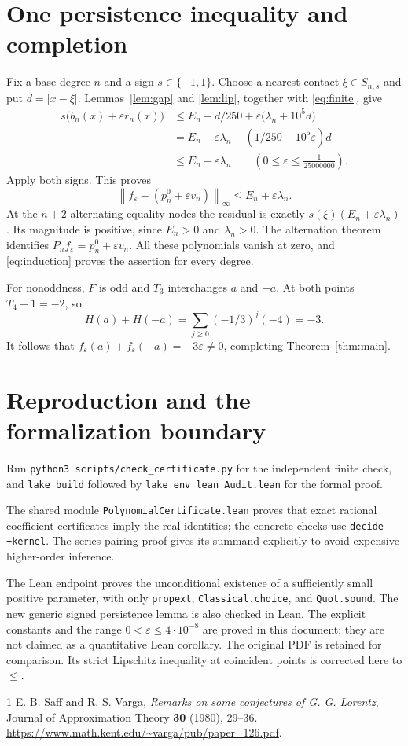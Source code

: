 \documentclass[11pt]{article}
\newcommand{\norm}[1]{\left\lVert #1\right\rVert_\infty}
\begin{document}
\section{One persistence inequality and completion}
Fix a base degree $n$ and a sign $s\in\{-1,1\}$. Choose a nearest contact
$\xi\in S_{n,s}$ and put $d=|x-\xi|$. Lemmas~\ref{lem:gap} and
\ref{lem:lip}, together with \eqref{eq:finite}, give
\begin{align*}
 s\bigl(b_n(x)+\varepsilon r_n(x)\bigr)
 &\le E_n-d/250+\varepsilon\bigl(\lambda_n+10^5d\bigr)\\
 &=E_n+\varepsilon\lambda_n-(1/250-10^5\varepsilon)d\\
 &\le E_n+\varepsilon\lambda_n
 \qquad\left(0\le\varepsilon\le\frac1{25000000}\right).
\end{align*}
Apply both signs. This proves
\[
 \norm{f_\varepsilon-(p_n^0+\varepsilon v_n)}\le E_n+\varepsilon\lambda_n.
\]
At the $n+2$ alternating equality nodes the residual is exactly
$s(\xi)(E_n+\varepsilon\lambda_n)$. Its magnitude is positive, since
$E_n>0$ and $\lambda_n>0$. The alternation theorem identifies
$P_n f_\varepsilon=p_n^0+\varepsilon v_n$. All these polynomials vanish at
zero, and \eqref{eq:induction} proves the assertion for every degree.

For nonoddness, $F$ is odd and $T_3$ interchanges $a$ and $-a$.
At both points $T_4-1=-2$, so
\[
 H(a)+H(-a)=\sum_{j\ge0}(-1/3)^j(-4)=-3.
\]
It follows that $f_\varepsilon(a)+f_\varepsilon(-a)=-3\varepsilon\ne0$,
completing Theorem~\ref{thm:main}.

\section*{Reproduction and the formalization boundary}
Run \texttt{python3 scripts/check\_certificate.py} for the independent finite
check, and \texttt{lake build} followed by \texttt{lake env lean Audit.lean}
for the formal proof.

The shared module \texttt{PolynomialCertificate.lean}
proves that exact rational coefficient certificates imply the real identities;
the concrete checks use \texttt{decide +kernel}. The series pairing proof gives
its summand explicitly to avoid expensive higher-order inference.

The Lean endpoint proves the unconditional existence of a sufficiently small
positive parameter, with only \texttt{propext}, \texttt{Classical.choice}, and
\texttt{Quot.sound}. The new generic signed persistence lemma is also checked
in Lean. The explicit constants and the range $0<\varepsilon\le4\cdot10^{-8}$
are proved in this document; they are not claimed as a quantitative Lean
corollary. The original PDF is retained for comparison. Its strict
Lipschitz inequality at coincident points is corrected here to $\le$.
\begin{thebibliography}{1}
 E. B. Saff and R. S. Varga,
\emph{Remarks on some conjectures of G. G. Lorentz},
Journal of Approximation Theory \textbf{30} (1980), 29--36.
\url{https://www.math.kent.edu/~varga/pub/paper_126.pdf}.
\end{thebibliography}
\end{document}
